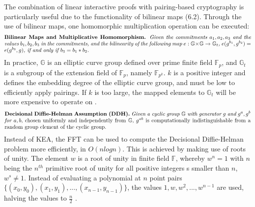 The combination of linear interactive proofs with pairing-based cryptography is particularly useful due to the functionality of bilinear maps (6.2). Through the use of bilinear maps, one homomorphic multiplication operation can be executed:
\begin{align*}
    \text{\parbox{450pt}{\textbf{Bilinear Maps and Multiplicative Homomorphism.} \textit{Given the commitments \(a_1, a_2, a_3\) and the values \(b_1, b_2, b_3\) in the commitments, and the bilinearity of the following map \begin{math}
        e: \mathbb{G} \times \mathbb{G} \to \mathbb{G}_t
    \end{math}, \(e(g^{b_1}, g^{b_2}) = e(g^{b_3}, g)\), if and only if \(b_3 = b_1 * b_2\).}}}
\end{align*}
In practice, \begin{math} \mathbb{G} \end{math} is an elliptic curve group defined over prime finite field \begin{math} \mathbb{F}_p \end{math}, and \begin{math} \mathbb{G}_t \end{math} is a subgroup of the extension field of \begin{math} \mathbb{F}_p \end{math}, namely \begin{math} \mathbb{F}_{p^k} \end{math}. \(k\) is a positive integer and defines the embedding degree of the elliptic curve group, and must be low to efficiently apply pairings. If \(k\) is too large, the mapped elements to \begin{math} \mathbb{G}_t \end{math} will be more expensive to operate on \citep{Thaler}.
\begin{align*}
    \text{\parbox{450pt}{\textbf{Decisional Diffie-Helman Assumption (DDH).} \textit{Given a cyclic group \begin{math}\mathbb{G}\end{math} with generator \(g\) and \(g^a, g^b\) for \(a, b\)}, chosen uniformly and independently from \begin{math}\mathbb{G}\end{math}, \(g^{ab}\) is computationally indistinguishable from a random group element of the cyclic group.}}
\end{align*}
Instead of KEA, the FFT can be used to compute the Decisional Diffie-Helman problem more efficiently, in \(O(nlogn)\). This is achieved by making use of roots of unity. The element \(w\) is a root of unity in finite field \begin{math} \mathbb{F}\end{math}, whereby \(w^n = 1\) with \(n\) being the \(n^{th}\) primitive root of unity for all positive integers s smaller than \(n\), \(w^s \neq 1 \). Instead of evaluating a polynomial at \(n\) point pairs \(\{(x_0,y_0), (x_1,y_1), ..., (x_{n-1}, y_{n-1})\}\), the values \(1, w, w^2, ..., w^{n-1}\) are used, halving the values to \(\frac{n}{2}\) \citep{Groth2016OnTS}.

